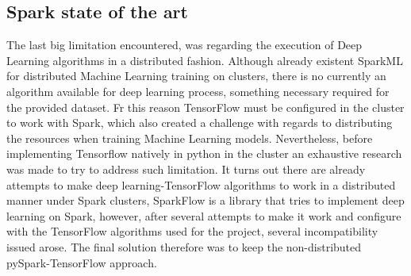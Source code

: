 \subsection{Spark state of the art}

The last big limitation encountered, was regarding the execution of Deep Learning algorithms in a distributed fashion. Although already existent SparkML for distributed Machine Learning training on clusters, there is no currently an algorithm available for deep learning process, something necessary required for the provided dataset. Fr this reason TensorFlow must be configured in the cluster to work with Spark, which also created a challenge with regards to distributing the resources when training Machine Learning models. Nevertheless, before implementing Tensorflow natively in python in the cluster an exhaustive research was made to try to address such limitation. It turns out there are already attempts to make deep learning-TensorFlow algorithms to work in a distributed manner under Spark clusters, SparkFlow\cite{lifeomicsparkflow_2020} is a library that tries to implement deep learning on Spark, however, after several attempts to make it work and configure with the TensorFlow algorithms used for the project, several incompatibility issued arose. The final solution therefore was to keep the non-distributed pySpark-TensorFlow approach.
